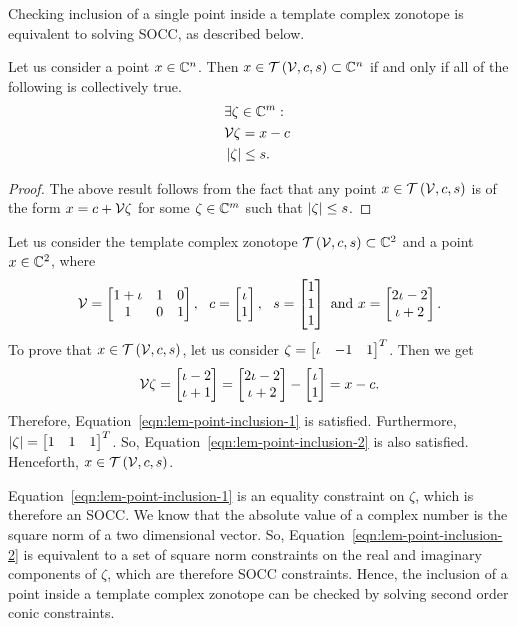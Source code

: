 Checking inclusion of a single point inside a template complex
zonotope is equivalent to solving SOCC, as described below.
%
\begin{lemma}
Let us consider a point $x\in\mathbb{C}^n$.  Then
$x\in\mathit{\operatorname{\mathcal{T}}}\left(\mathcal{V},c,s\right)\subset\mathbb{C}^n$ if and only if
all of the following is collectively true.
%
\begin{align}
& \exists\zeta\in\mathbb{C}^m:\nonumber\\
& \mathcal{V}\zeta = x-c~\label{eqn:lem-point-inclusion-1}\\
& \left|\zeta\right|\leq s.~\label{eqn:lem-point-inclusion-2}
\end{align}
%
\end{lemma}
%
\begin{proof}
The above result follows from the fact that any point 
$x\in\mathit{\operatorname{\mathcal{T}}}\left(\mathcal{V},c,s\right)$ is of the form
$x=c+\mathcal{V}\zeta$ for some $\zeta\in\mathbb{C}^m$ such that
$\left|\zeta\right|\leq s$.
\end{proof}
%
\begin{example}
Let us consider the template complex zonotope
$\mathit{\operatorname{\mathcal{T}}}\left(\mathcal{V},c,s\right)\subset\mathbb{C}^2$ and a point $x\in\mathbb{C}^2$,
where
%
\[
\mathcal{V}=\left[\begin{matrix}1+\iota & 1 & 0\\1 & 0 & 1\end{matrix}\right],~~c = \left[\begin{matrix}\iota\\ 1\end{matrix}\right],~~s=\left[\begin{matrix}1\\1\\1\end{matrix}\right]~\text{and}~x=\left[\begin{matrix}2\iota-2\\\iota+2\end{matrix}\right].
\]
%
To prove that $x\in\mathit{\operatorname{\mathcal{T}}}\left(\mathcal{V},c,s\right)$, let us consider
$\zeta=\left[\begin{matrix}\iota & -1 & 1\end{matrix}\right]^T$.  Then we get
%
\[
\mathcal{V}\zeta = \left[\begin{matrix}\iota-2\\\iota+1\end{matrix}\right]= \left[\begin{matrix}2\iota-2\\\iota+2\end{matrix}\right]-\left[\begin{matrix}\iota\\1\end{matrix}\right]=x-c.
\]
%
Therefore, Equation~\ref{eqn:lem-point-inclusion-1} is satisfied.  Furthermore,
$\left|\zeta\right|=\left[\begin{matrix}1 & 1 & 1\end{matrix}\right]^T$.  So, Equation~\ref{eqn:lem-point-inclusion-2} is
also satisfied.  Henceforth, $x\in\mathit{\operatorname{\mathcal{T}}}\left(\mathcal{V},c,s\right)$.
\end{example}
%
Equation~\ref{eqn:lem-point-inclusion-1} is an equality constraint on
$\zeta$, which is therefore an SOCC.  We know that the absolute value
of a complex number is the square norm of a two dimensional vector.
So, Equation~\ref{eqn:lem-point-inclusion-2} is equivalent to a set of
square norm constraints on the real and imaginary components of
$\zeta$, which are therefore SOCC constraints.  Hence, the inclusion
of a point inside a template complex zonotope can be checked by
solving second order conic constraints.

